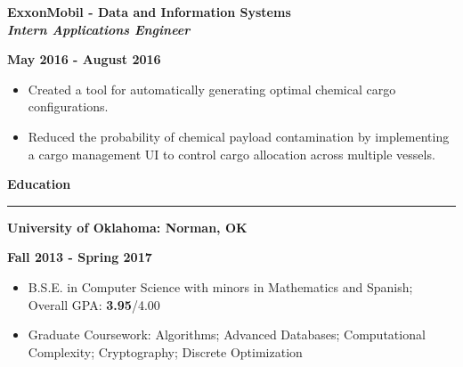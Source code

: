 \documentclass[10pt,letterpaper]{article}
\begin{document}
\medskip

\begin{minipage}[t]{0.53\textwidth}
    \begin{flushleft}
        \textbf{ExxonMobil - Data and Information Systems}\\
        \textbf{\textit{Intern Applications Engineer}}\\
    \end{flushleft}
\end{minipage}
\begin{minipage}[t]{0.44\textwidth}
    \begin{flushright}
        \textbf{May 2016 - August 2016}
    \end{flushright}
\end{minipage}

\begin{itemize}[noitemsep,topsep=0pt]
    \setlength\itemsep{0.2em}
    \item Created a tool for automatically generating optimal chemical cargo
          configurations.
    \item Reduced the probability of chemical payload contamination by
          implementing a cargo management UI to control cargo allocation
          across multiple vessels.

\end{itemize}

\medskip

\begin{large}
    \textbf{Education}
\end{large}

\smallskip \hrule \smallskip

\begin{minipage}[t]{0.5\textwidth}
    \begin{flushleft}
        \textbf{University of Oklahoma: Norman, OK}\\

    \end{flushleft}
\end{minipage}
\begin{minipage}[t]{0.47\textwidth}
    \begin{flushright}
        \textbf{Fall 2013 - Spring 2017}

    \end{flushright}
\end{minipage}
\begin{itemize}[topsep=0pt]
    \setlength\itemsep{0.2em}
    \item B.S.E. in Computer Science with minors in Mathematics and Spanish;
          Overall GPA: \textbf{3.95}/{4.00}
    \item Graduate Coursework: Algorithms;
                               Advanced Databases;
                               Computational Complexity;
                               Cryptography;
                               Discrete Optimization
\end{itemize}
\end{document}
